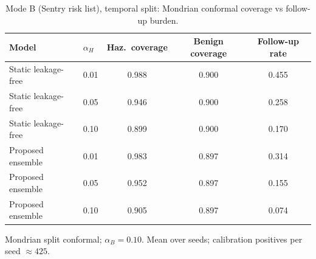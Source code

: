 \begin{table}[t]
\centering
\small
\caption{Mode B (Sentry risk list), temporal split: Mondrian conformal coverage vs follow-up burden.}
\label{tab:conf_sentry_temporal}
\begin{tabular}{llccc}
\toprule
Model & $\alpha_H$ & Haz.\ coverage & Benign coverage & Follow-up rate \\
\midrule
Static leakage-free & 0.01 & 0.988 & 0.900 & 0.455 \\
Static leakage-free & 0.05 & 0.946 & 0.900 & 0.258 \\
Static leakage-free & 0.10 & 0.899 & 0.900 & 0.170 \\
\midrule
Proposed ensemble & 0.01 & 0.983 & 0.897 & 0.314 \\
Proposed ensemble & 0.05 & 0.952 & 0.897 & 0.155 \\
Proposed ensemble & 0.10 & 0.905 & 0.897 & 0.074 \\
\bottomrule
\end{tabular}
\par\vspace{2pt}\footnotesize Mondrian split conformal; $\alpha_B=0.10$. Mean over seeds; calibration positives per seed $\approx 425$.
\end{table}
